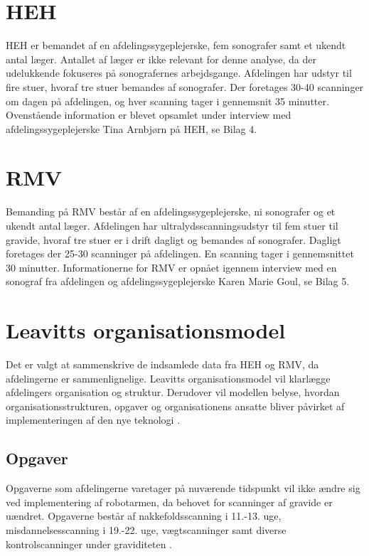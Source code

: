 \section{HEH}
HEH er bemandet af en afdelingssygeplejerske, fem sonografer samt et ukendt antal læger. Antallet af læger er ikke relevant for denne analyse, da der udelukkende fokuseres på sonografernes arbejdsgange.
Afdelingen har udstyr til fire stuer, hvoraf tre stuer bemandes af sonografer. Der foretages 30-40 scanninger om dagen på afdelingen, og hver scanning tager i gennemsnit 35 minutter. 
Ovenstående information er blevet opsamlet under interview med afdelingssygeplejerske Tina Arnbjørn på HEH, se Bilag 4.

\section{RMV}
Bemanding på RMV består af en afdelingssygeplejerske, ni sonografer og et ukendt antal læger. Afdelingen har ultralydsscanningsudstyr til fem stuer til gravide, hvoraf tre stuer er i drift dagligt og bemandes af sonografer. Dagligt foretages der 25-30 scanninger på afdelingen. En scanning tager i gennemsnittet 30 minutter.
Informationerne for RMV er opnået igennem interview med en sonograf fra afdelingen og afdelingssygeplejerske Karen Marie Goul, se Bilag 5.

\section{Leavitts organisationsmodel}
Det er valgt at sammenskrive de indsamlede data fra HEH og RMV, da afdelingerne er sammenlignelige. Leavitts organisationsmodel vil klarlægge afdelingers organisation og struktur. Derudover vil modellen belyse, hvordan organisationsstrukturen, opgaver og organisationens ansatte bliver påvirket af implementeringen af den nye teknologi \cite{Leavitt} \cite{diamantmodel}. 


\subsection{Opgaver}
Opgaverne som afdelingerne varetager på nuværende tidspunkt vil ikke ændre sig ved implementering af robotarmen, da behovet for scanninger af gravide er uændret. Opgaverne består af nakkefoldsscanning i 11.-13. uge, misdannelsesscanning i 19.-22. uge, vægtscanninger samt diverse kontrolscanninger under graviditeten \cite{graviditet}.

